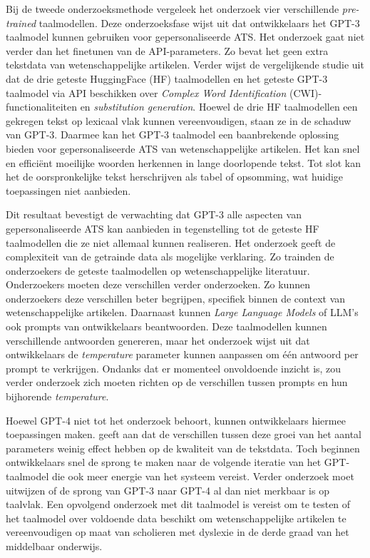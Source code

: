 \medspace

Bij de tweede onderzoeksmethode vergeleek het onderzoek vier verschillende \textit{pre-trained} taalmodellen. Deze onderzoeksfase wijst uit dat ontwikkelaars het GPT-3 taalmodel kunnen gebruiken voor gepersonaliseerde ATS. Het onderzoek gaat niet verder dan het finetunen van de API-parameters. Zo bevat het geen extra tekstdata van wetenschappelijke artikelen. Verder wijst de vergelijkende studie uit dat de drie geteste HuggingFace (HF) taalmodellen en het geteste GPT-3 taalmodel via API beschikken over \textit{Complex Word Identification} (CWI)-functionaliteiten en \textit{substitution generation}. Hoewel de drie HF taalmodellen een gekregen tekst op lexicaal vlak kunnen vereenvoudigen, staan ze in de schaduw van GPT-3. Daarmee kan het GPT-3 taalmodel een baanbrekende oplossing bieden voor gepersonaliseerde ATS van wetenschappelijke artikelen. Het kan snel en efficiënt moeilijke woorden herkennen in lange doorlopende tekst. Tot slot kan het de oorspronkelijke tekst herschrijven als tabel of opsomming, wat huidige toepassingen niet aanbieden.

\medspace

Dit resultaat bevestigt de verwachting dat GPT-3 alle aspecten van gepersonaliseerde ATS kan aanbieden in tegenstelling tot de geteste HF taalmodellen die ze niet allemaal kunnen realiseren. Het onderzoek geeft de complexiteit van de getrainde data als mogelijke verklaring. Zo trainden de onderzoekers de geteste taalmodellen op wetenschappelijke literatuur. Onderzoekers moeten deze verschillen verder onderzoeken. Zo kunnen onderzoekers deze verschillen beter begrijpen, specifiek binnen de context van wetenschappelijke artikelen. Daarnaast kunnen \textit{Large Language Models} of LLM's ook prompts van ontwikkelaars beantwoorden. Deze taalmodellen kunnen verschillende antwoorden genereren, maar het onderzoek wijst uit dat ontwikkelaars de \textit{temperature} parameter kunnen aanpassen om één antwoord per prompt te verkrijgen. Ondanks dat er momenteel onvoldoende inzicht is, zou verder onderzoek zich moeten richten op de verschillen tussen prompts en hun bijhorende \textit{temperature}.

\medspace

Hoewel GPT-4 niet tot het onderzoek behoort, kunnen ontwikkelaars hiermee toepassingen maken. \textcite{Simon2021} geeft aan dat de verschillen tussen deze groei van het aantal parameters weinig effect hebben op de kwaliteit van de tekstdata. Toch beginnen ontwikkelaars snel de sprong te maken naar de volgende iteratie van het GPT-taalmodel die ook meer energie van het systeem vereist. Verder onderzoek moet uitwijzen of de sprong van GPT-3 naar GPT-4 al dan niet merkbaar is op taalvlak. Een opvolgend onderzoek met dit taalmodel is vereist om te testen of het taalmodel over voldoende data beschikt om wetenschappelijke artikelen te vereenvoudigen op maat van scholieren met dyslexie in de derde graad van het middelbaar onderwijs. 

